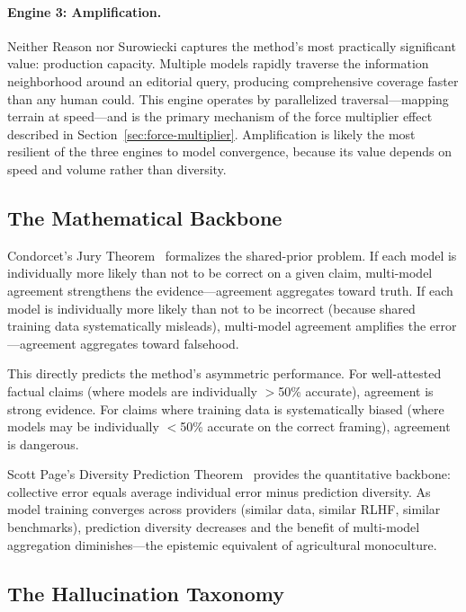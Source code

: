 \documentclass[11pt,letterpaper]{article}
\begin{document}
\paragraph{Engine 3: Amplification.} Neither Reason nor Surowiecki captures the method's most practically significant value: production capacity. Multiple models rapidly traverse the information neighborhood around an editorial query, producing comprehensive coverage faster than any human could. This engine operates by parallelized traversal---mapping terrain at speed---and is the primary mechanism of the force multiplier effect described in Section~\ref{sec:force-multiplier}. Amplification is likely the most resilient of the three engines to model convergence, because its value depends on speed and volume rather than diversity.

\subsection{The Mathematical Backbone}

Condorcet's Jury Theorem~\cite{condorcet1785} formalizes the shared-prior problem. If each model is individually more likely than not to be correct on a given claim, multi-model agreement strengthens the evidence---agreement aggregates toward truth. If each model is individually more likely than not to be incorrect (because shared training data systematically misleads), multi-model agreement amplifies the error---agreement aggregates toward falsehood.

This directly predicts the method's asymmetric performance. For well-attested factual claims (where models are individually $>$50\% accurate), agreement is strong evidence. For claims where training data is systematically biased (where models may be individually $<$50\% accurate on the correct framing), agreement is dangerous.

Scott Page's Diversity Prediction Theorem~\cite{page2007} provides the quantitative backbone: collective error equals average individual error minus prediction diversity. As model training converges across providers (similar data, similar RLHF, similar benchmarks), prediction diversity decreases and the benefit of multi-model aggregation diminishes---the epistemic equivalent of agricultural monoculture.

\subsection{The Hallucination Taxonomy}
\end{document}
